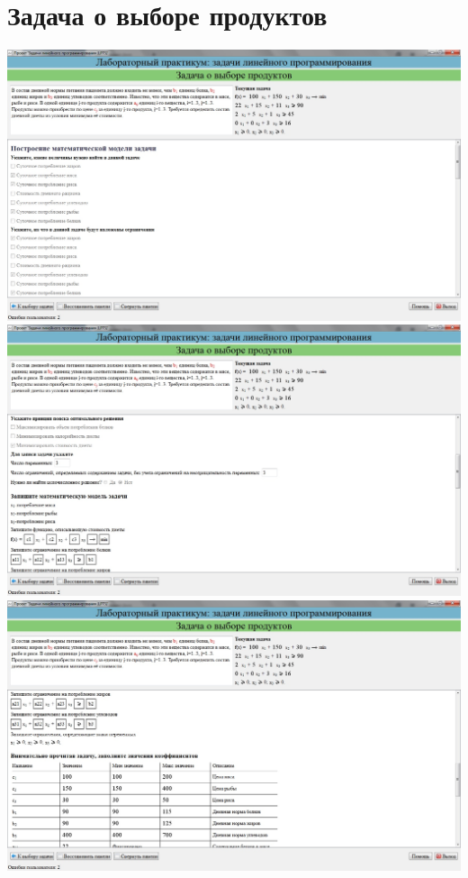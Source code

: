 \section{Задача о выборе продуктов}

\includegraphics[width=\linewidth]{om_hw_02/images/4_1.jpg}\\
\includegraphics[width=\linewidth]{om_hw_02/images/4_2.jpg}\\
\includegraphics[width=\linewidth]{om_hw_02/images/4_3.jpg}\\
